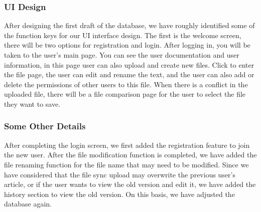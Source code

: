 \subsubsection{UI Design}
\noindent After designing the first draft of the database, we have roughly identified some of the function keys for our UI interface design. The first is the welcome screen, there will be two options for registration and login. After logging in, you will be taken to the user's main page. You can see the user documentation and user information, in this page user can also upload and create new files. Click to enter the file page, the user can edit and rename the text, and the user can also add or delete the permissions of other users to this file. When there is a conflict in the uploaded file, there will be a file comparison page for the user to select the file they want to save.

\subsubsection{Some Other Details}
\noindent After completing the login screen, we first added the registration feature to join the new user. After the file modification function is completed, we have added the file renaming function for the file name that may need to be modified. Since we have considered that the file sync upload may overwrite the previous user's article, or if the user wants to view the old version and edit it, we have added the history section to view the old version. On this basis, we have adjusted the database again.

